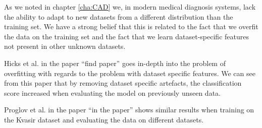 As we noted in chapter \ref{cha:CAD} we, in modern medical diagnosis systems, lack the ability to adapt to new datasets from a different distribution than the training set. We have a strong belief that this is related to the fact that we overfit the data on the training set and the fact that we learn dataset-specific features not present in other unknown datasets.


Hicks et al. in the paper ``find paper'' goes in-depth into the problem of overfitting with regards to the problem with dataset specific features. We can see from this paper that by removing dataset specific artefacts, the classification score increased when evaluating the model on previously unseen data.

Proglov et al. in the paper ``in the paper'' shows similar results when training on the Kvasir dataset and evaluating the data on different datasets.



